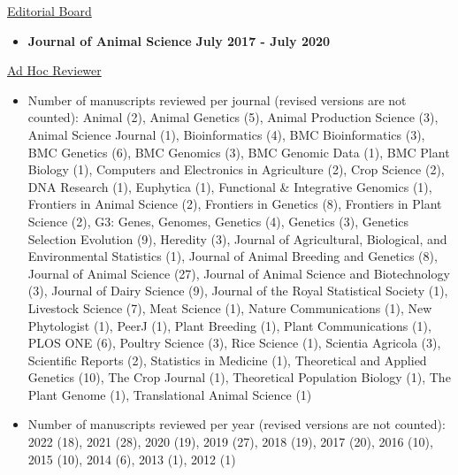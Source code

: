 \documentclass[margin,line,10pt]{res}
\begin{document}
\begin{resume}
\underline{Editorial Board}
 \vspace{.2cm}
\begin{itemize}
\item {\bf Journal of Animal Science} \hfill  {\bf July 2017 - July 2020} 
\end{itemize}





\vspace{0.3cm}
\underline{Ad Hoc Reviewer}
\begin{itemize}
    \vspace{.1cm}
\item  Number of manuscripts reviewed per journal (revised versions are not counted): Animal (2), Animal Genetics (5), Animal Production Science (3), Animal Science Journal (1), Bioinformatics (4), BMC Bioinformatics (3), BMC Genetics (6), BMC Genomics (3), BMC Genomic Data (1), BMC Plant Biology (1), Computers and Electronics in Agriculture (2), Crop Science (2), DNA Research (1),  Euphytica (1), Functional \& Integrative Genomics (1), Frontiers in Animal Science (2), Frontiers in Genetics (8), Frontiers in Plant Science (2), G3: Genes, Genomes, Genetics (4), Genetics (3), Genetics Selection Evolution (9), Heredity (3), Journal of Agricultural, Biological, and Environmental Statistics (1), Journal of Animal Breeding and Genetics (8), Journal of Animal Science (27), Journal of Animal Science and Biotechnology (3), Journal of Dairy Science (9), Journal of the Royal Statistical Society (1), Livestock Science (7), Meat Science (1), Nature Communications (1), New Phytologist (1), PeerJ (1), Plant Breeding (1), Plant Communications (1), PLOS ONE (6), Poultry Science (3), Rice Science (1), Scientia Agricola (3), Scientific Reports (2), Statistics in Medicine (1), Theoretical and Applied Genetics (10), The Crop Journal (1), Theoretical Population Biology (1), The Plant Genome (1), Translational Animal Science (1)  
  \vspace{.1cm}
  \item Number of manuscripts reviewed per year (revised versions are not counted): 2022 (18), 2021 (28), 2020 (19), 2019 (27), 2018 (19), 2017 (20), 2016 (10), 2015 (10), 2014 (6), 2013 (1), 2012 (1)
\end{itemize}



\begin{comment}
\vspace{0.5cm}
\section{\sc Manuscripts under review}


\end{comment}
\end{resume}
\end{document}
